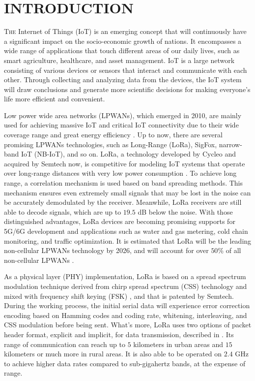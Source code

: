 \documentclass{IEEEtaes}
\theoremstyle{plain}
\begin{document}
\section{INTRODUCTION}
T{\scshape he} Internet of Things (IoT) is an emerging concept that will continuously have a significant impact on the socio-economic growth of nations. It encompasses a wide range of applications that touch different areas of our daily lives, such as smart agriculture, healthcare, and asset management. IoT is a large network consisting of various devices or sensors that interact and communicate with each other. Through collecting and analyzing data from the devices, the IoT system will draw conclusions and generate more scientific decisions for making everyone's life more efficient and convenient.

Low power wide area networks (LPWANs), which emerged in 2010, are mainly used for achieving massive IoT and critical IoT connectivity due to their wide coverage range and great energy efficiency \cite{chettri2019comprehensive}. Up to now, there are several promising LPWANs technologies, such as Long-Range (LoRa), SigFox, narrow-band IoT (NB-IoT), and so on. LoRa, a technology developed by Cycleo and acquired by Semtech now, is competitive for modeling IoT systems that operate over long-range distances with very low power consumption \cite{Semtech_LoRa}. To achieve long range, a correlation mechanism is used based on band spreading methods. This mechanism ensures even extremely small signals that may be lost in the noise can be accurately demodulated by the receiver. Meanwhile, LoRa receivers are still able to decode signals, which are up to $19.5$ dB below the noise. With those distinguished advantages, LoRa devices are becoming promising supports for 5G/6G development and applications such as water and gas metering, cold chain monitoring, and traffic optimization. It is estimated that LoRa will be the leading non-cellular LPWANs technology by 2026, and will account for over $50$\% of all non-cellular LPWANs \cite{krishnan2020lorawan}.

As a physical layer (PHY) implementation, LoRa is based on a spread spectrum modulation technique derived from chirp spread spectrum (CSS) technology and mixed with frequency shift keying (FSK) \cite{vangelista2017frequency,bor2016lora}, and that is patented by Semtech. During the working process, the initial serial data will experience error correction encoding based on Hamming codes and coding rate, whitening, interleaving, and CSS modulation before being sent. What's more, LoRa uses two options of packet header format, explicit and implicit, for data transmission, described in \cite{LoRaWAN}. Its range of communication can reach up to $5$ kilometers in urban areas and $15$ kilometers or much more in rural areas. It is also able to be operated on $2.4$ GHz to achieve higher data rates compared to sub-gigahertz bands, at the expense of range.
\end{document}
